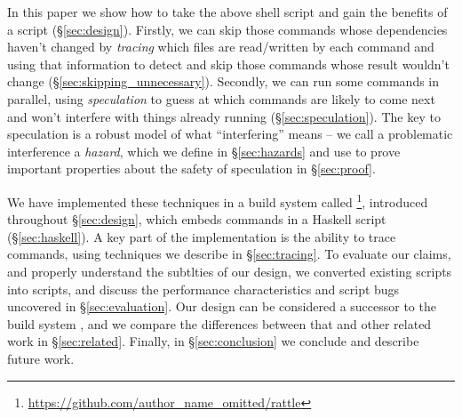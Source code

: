 In this paper we show how to take the above shell script and gain the benefits of a \Make script (\S\ref{sec:design}). Firstly, we can skip those commands whose dependencies haven't changed by \emph{tracing} which files are read/written by each command and using that information to detect and skip those commands whose result wouldn't change (\S\ref{sec:skipping_unnecessary}). Secondly, we can run some commands in parallel, using \emph{speculation} to guess at which commands are likely to come next and won't interfere with things already running (\S\ref{sec:speculation}). The key to speculation is a robust model of what ``interfering'' means -- we call a problematic interference a \emph{hazard}, which we define in \S\ref{sec:hazards} and use to prove important properties about the safety of speculation in \S\ref{sec:proof}.

We have implemented these techniques in a build system called \Rattle\footnote{\url{https://github.com/author_name_omitted/rattle}}, introduced throughout \S\ref{sec:design}, which embeds commands in a Haskell script (\S\ref{sec:haskell}). A key part of the implementation is the ability to trace commands, using techniques we describe in \S\ref{sec:tracing}. To evaluate our claims, and properly understand the subtlties of our design, we converted existing \Make scripts into \Rattle scripts, and discuss the performance characteristics and \Make script bugs uncovered in \S\ref{sec:evaluation}. Our design can be considered a successor to the \Memoize build system \cite{memoize}, and we compare the differences between that and other related work in \S\ref{sec:related}. Finally, in \S\ref{sec:conclusion} we conclude and describe future work.
